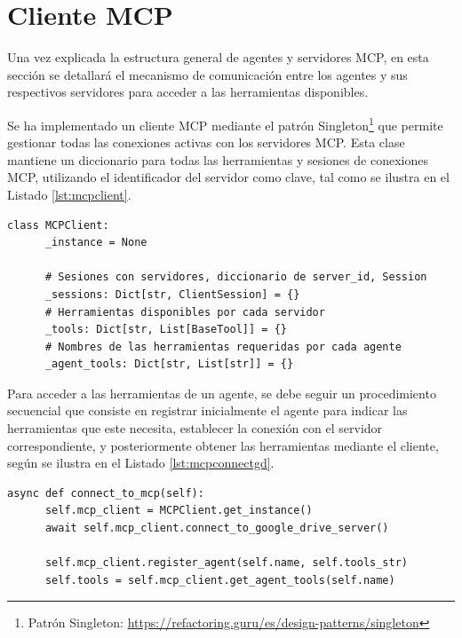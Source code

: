\section{Cliente MCP}
\label{sec:gestionmcp}
Una vez explicada la estructura general de agentes y servidores MCP, en esta sección se detallará el mecanismo de comunicación entre los agentes y sus respectivos servidores para acceder a las herramientas disponibles.

Se ha implementado un cliente MCP mediante el patrón Singleton\footnote{Patrón Singleton: \url{https://refactoring.guru/es/design-patterns/singleton}} que permite gestionar todas las conexiones activas con los servidores MCP. Esta clase mantiene un diccionario para todas las herramientas y sesiones de conexiones MCP, utilizando el identificador del servidor como clave, tal como se ilustra en el Listado \ref{lst:mcpclient}.


\begin{lstlisting}[caption={\protect\opus{mcp_multi_client.py}: clase Singleton MCPClient},label={lst:mcpclient}]
  class MCPClient:
      _instance = None

      # Sesiones con servidores, diccionario de server_id, Session
      _sessions: Dict[str, ClientSession] = {}
      # Herramientas disponibles por cada servidor
      _tools: Dict[str, List[BaseTool]] = {}
      # Nombres de las herramientas requeridas por cada agente
      _agent_tools: Dict[str, List[str]] = {}
\end{lstlisting}

Para acceder a las herramientas de un agente, se debe seguir un procedimiento secuencial que consiste en registrar inicialmente el agente para indicar las herramientas que este necesita, establecer la conexión con el servidor correspondiente, y posteriormente obtener las herramientas mediante el cliente, según se ilustra en el Listado \ref{lst:mcpconnectgd}.

\begin{lstlisting}[caption={\protect\opus{google_drive_agent_graph.py}: función \protect\opus{connect_to_mcp} en agente Google Drive},label={lst:mcpconnectgd}]
  async def connect_to_mcp(self):
      self.mcp_client = MCPClient.get_instance()
      await self.mcp_client.connect_to_google_drive_server()

      self.mcp_client.register_agent(self.name, self.tools_str)
      self.tools = self.mcp_client.get_agent_tools(self.name)
\end{lstlisting}

